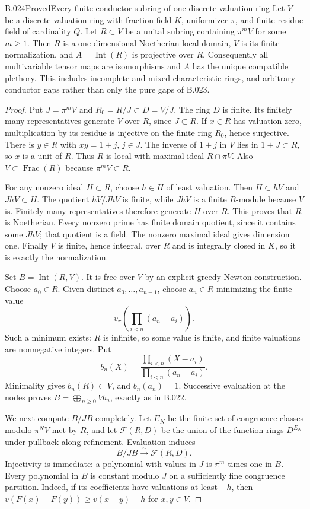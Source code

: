 \begin{saresult}{B.024}{Proved}{Every finite-conductor subring of one discrete valuation ring}
Let $V$ be a discrete valuation ring with fraction field $K$,
uniformizer $\pi$, and finite residue field of cardinality $Q$.
Let $R\subset V$ be a unital subring containing $\pi^mV$ for some
$m\ge1$. Then $R$ is a one-dimensional Noetherian local domain,
$V$ is its finite normalization, and
$A=\operatorname{Int}(R)$ is projective over $R$. Consequently
all multivariable tensor maps are isomorphisms and $A$ has the
unique compatible plethory. This includes incomplete and mixed
characteristic rings, and arbitrary conductor gaps rather than
only the pure gaps of B.023.
\end{saresult}
\begin{proof}
Put $J=\pi^mV$ and $R_0=R/J\subset D=V/J$. The ring $D$ is finite.
Its finitely many representatives generate $V$ over $R$, since
$J\subset R$. If $x\in R$ has valuation zero, multiplication by
its residue is injective on the finite ring $R_0$, hence surjective.
There is $y\in R$ with $xy=1+j$, $j\in J$. The inverse of $1+j$
in $V$ lies in $1+J\subset R$, so $x$ is a unit of $R$.
Thus $R$ is local with maximal ideal $R\cap\pi V$.
Also $V\subset\operatorname{Frac}(R)$ because $\pi^mV\subset R$.

For any nonzero ideal $H\subset R$, choose $h\in H$ of least
valuation. Then $H\subset hV$ and $JhV\subset H$.
The quotient $hV/JhV$ is finite, while $JhV$ is a finite $R$-module
because $V$ is. Finitely many representatives therefore generate
$H$ over $R$. This proves that $R$ is Noetherian. Every nonzero
prime has finite domain quotient, since it contains some $JhV$;
that quotient is a field. The nonzero maximal ideal gives dimension
one. Finally $V$ is finite, hence integral, over $R$ and is
integrally closed in $K$, so it is exactly the normalization.

Set $B=\operatorname{Int}(R,V)$. It is free over $V$ by an explicit
greedy Newton construction. Choose $a_0\in R$. Given distinct
$a_0,\ldots,a_{n-1}$, choose $a_n\in R$ minimizing the finite value
\[
 v_\pi\left(\prod_{i<n}(a_n-a_i)\right).
\]
Such a minimum exists: $R$ is infinite, so some value is finite,
and finite valuations are nonnegative integers. Put
\[
 b_n(X)=\frac{\prod_{i<n}(X-a_i)}{\prod_{i<n}(a_n-a_i)}.
\]
Minimality gives $b_n(R)\subset V$, and $b_n(a_n)=1$.
Successive evaluation at the nodes proves
$B=\bigoplus_{n\ge0}Vb_n$, exactly as in B.022.

We next compute $B/JB$ completely. Let $E_N$ be the finite set of
congruence classes modulo $\pi^NV$ met by $R$, and let
$\mathcal F(R,D)$ be the union of the function rings $D^{E_N}$
under pullback along refinement. Evaluation induces
\[
 B/JB\xrightarrow{\sim}\mathcal F(R,D).
\]
Injectivity is immediate: a polynomial with values in $J$ is
$\pi^m$ times one in $B$. Every polynomial in $B$ is constant
modulo $J$ on a sufficiently fine congruence partition. Indeed,
if its coefficients have valuations at least $-h$, then
$v(F(x)-F(y))\ge v(x-y)-h$ for $x,y\in V$.


\end{proof}
